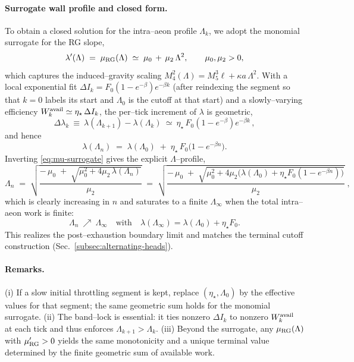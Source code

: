 \documentclass[10pt]{article}
\theoremstyle{definition}
\theoremstyle{plain}
\begin{document}
\paragraph{Surrogate wall profile and closed form.}\label{par:uom-main-157}
To obtain a closed solution for the intra--aeon profile $\Lambda_k$, we adopt the monomial surrogate for the RG slope,
\begin{equation}
\lambda'(\Lambda)\;=\;\mu_{\rm RG}(\Lambda)\;\simeq\; \mu_0\,+\,\mu_2\,\Lambda^{2},
\qquad \mu_0,\mu_2>0,
\label{eq:mu-surrogate}
\end{equation}
which captures the induced--gravity scaling $M_4^2(\Lambda)=M_5^3\ell+\kappa a\,\Lambda^2$.
With a local exponential fit $\Delta I_k=F_0(1-e^{-\beta})e^{-\beta k}$ (after reindexing the segment so that $k=0$
labels its start and $\Lambda_0$ is the cutoff at that start) and a slowly--varying efficiency
\(
W^{\rm avail}_k \simeq \eta_\star\,\Delta I_k
\),
the per--tick increment of \(\lambda\) is geometric,
\[
\Delta\lambda_k\ \equiv\ \lambda(\Lambda_{k+1})-\lambda(\Lambda_k)
\ \simeq\ \eta_\star\,F_0(1-e^{-\beta})e^{-\beta k}\,,
\]
and hence
\begin{equation}
\lambda(\Lambda_n)\;=\;\lambda(\Lambda_{0})\;+\;\eta_\star\,F_0\Big(1-e^{-\beta n}\Big).
\label{eq:lambda-geom}
\end{equation}
Inverting \eqref{eq:mu-surrogate} gives the explicit $\Lambda$--profile,
\begin{equation}
\Lambda_n\;=\;\sqrt{\frac{-\,\mu_0\;+\;\sqrt{\mu_0^2+4\mu_2\,\lambda(\Lambda_n)}}{\mu_2}}
\;=\;\sqrt{\frac{-\,\mu_0\;+\;\sqrt{\mu_0^2+4\mu_2\big(\lambda(\Lambda_{0})+\eta_\star F_0(1-e^{-\beta n})\big)}}{\mu_2}}\;,
\label{eq:Lambda-profile}
\end{equation}
which is clearly increasing in \(n\) and saturates to a finite \(\Lambda_\infty\) when the total intra--aeon work is finite:
\[
\Lambda_n\ \nearrow\ \Lambda_\infty
\quad\text{with}\quad
\lambda(\Lambda_\infty)=\lambda(\Lambda_{0})+\eta_\star F_0.
\]
This realizes the post--exhaustion boundary limit and matches the terminal cutoff construction (Sec.~\ref{subsec:alternating-heads}).

\paragraph{Remarks.}\label{par:uom-main-158}
(i) If a slow initial throttling segment is kept, replace \((\eta_\star,\Lambda_{0})\) by the effective values for that segment; the same geometric sum holds for the monomial surrogate.
(ii) The band--lock is essential: it ties nonzero $\Delta I_k$ to nonzero $W^{\rm avail}_k$ at each tick and thus enforces \(\Lambda_{k+1}>\Lambda_k\).
(iii) Beyond the surrogate, any $\mu_{\rm RG}(\Lambda)$ with $\mu_{\rm RG}'>0$ yields the same monotonicity and a unique terminal value determined by the finite geometric sum of available work.
\end{document}
